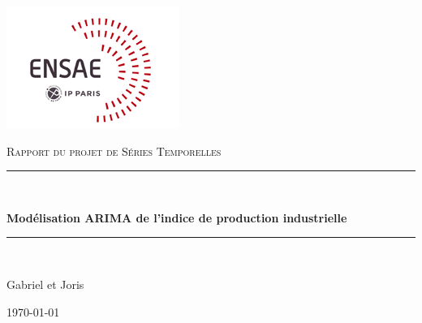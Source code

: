 \newcommand{\HRule}{\rule{\linewidth}{0.5mm}}
\begin{titlepage}
	\centering
	\includegraphics[width=0.5\linewidth]{pics/logo_ensae_IPP_1.png}\par\vspace{1cm}
	\vspace{0.5cm}
	{\scshape\Large Rapport du projet de Séries Temporelles \par}
	\vspace{1.5cm}
    \HRule \\[0.4cm]
	{\huge\bfseries Modélisation ARIMA de l’indice de production industrielle \par}
    \vspace{0.5cm}
    \HRule \\[0.4cm]
    \vspace{5cm}
	{\large Gabriel  et Joris  \par}
	\vfill
	\vfill
	{\large \today \par}
\end{titlepage}

